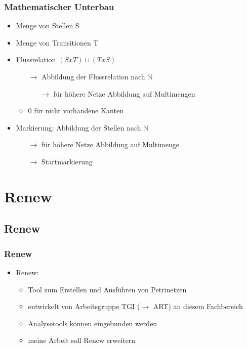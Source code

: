 \begin{frame}
	\frametitle{Mathematischer Unterbau}
	
	\begin{itemize}
		\item Menge von Stellen S
		\item Menge von Transitionen T
		\item Flussrelation $(S x T) \cup (T x S)$
		\begin{itemize}
			\item[$\rightarrow$] Abbildung der Flussrelation nach $\mathbb{N}$
			\begin{itemize}
				\item[$\rightarrow$] für höhere Netze Abbildung auf Multimengen
			\end{itemize}
			\item 0 für nicht vorhandene Kanten
		\end{itemize}
		\item Markierung: Abbildung der Stellen nach $\mathbb{N}$
		\begin{itemize}
			\item[$\rightarrow$] für höhere Netze Abbildung auf Multimenge
			\item[$\rightarrow$] Startmarkierung
		\end{itemize}
	\end{itemize}
\end{frame}


\section{Renew}
\subsection*{Renew}

\begin{frame}
	\frametitle{Renew}
	
	\begin{itemize}
		\item Renew:
		\begin{itemize}
			\item Tool zum Erstellen und Ausführen von Petrinetzen
			\item entwickelt von Arbeitsgruppe TGI ($\rightarrow$ ART) an diesem Fachbereich
			\item Analysetools können eingebunden werden
			\item meine Arbeit soll Renew erweitern
		\end{itemize}	
	\end{itemize}
\end{frame}

